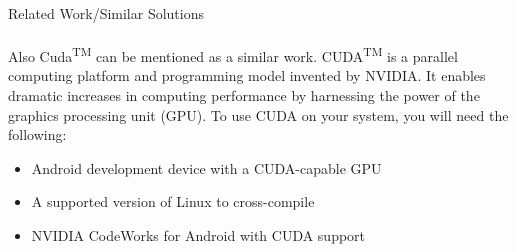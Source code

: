 \documentclass[12pt, a4paper]{article} \pagenumbering{gobble}
\begin{document}
\begin{section}{Related Work/Similar Solutions}
\paragraph{}{
Also Cuda\textsuperscript{TM} \cite{cuda} can be mentioned as a similar work. CUDA\textsuperscript{TM} is a parallel computing platform and programming model invented by
NVIDIA. It enables dramatic increases in computing performance by harnessing the power of the graphics processing unit
(GPU). To use CUDA on your system, you will need the following:
\begin{itemize}
  \item Android development device with a CUDA-capable GPU
  \item A supported version of Linux to cross-compile
  \item NVIDIA CodeWorks for Android with CUDA support
\end{itemize}
}

\end{section}

\newpage
\end{document}
